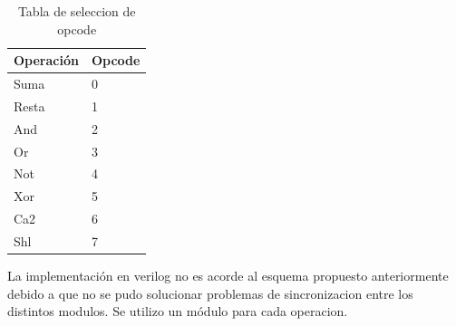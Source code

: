 \documentclass[../../../informe/src/main.tex]{subfiles}
\begin{document}
\begin{table}[h]
\begin{center}
\begin{tabular}{|l|l|}
\hline
Operación&Opcode\\
\hline \hline
 Suma& 0 \\ \hline
Resta& 1  \\ \hline
 And& 2  \\ \hline
 Or& 3  \\ \hline
 Not& 4  \\ \hline
 Xor& 5 \\ \hline
 Ca2& 6  \\ \hline
Shl& 7  \\ \hline

\end{tabular}
\caption{Tabla de seleccion de opcode} 
\label{tab=alu op}
\end{center}
\end{table}

La implementaci\'on en verilog no es acorde al esquema propuesto anteriormente debido a que no se pudo solucionar problemas de sincronizacion entre los distintos modulos. Se utilizo un m\'odulo para cada operacion.
\end{document}
